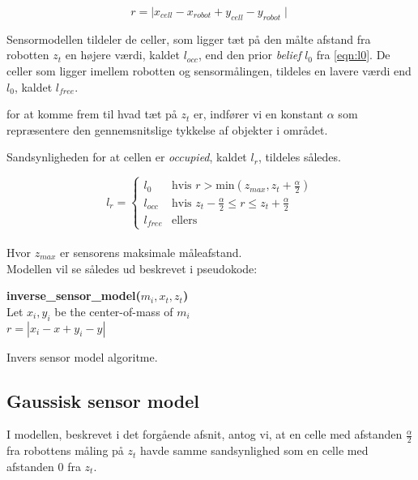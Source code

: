 \begin{equation}
r = \mid x_{cell} - x_{robot} + y_{cell} - y_{robot} \mid
\end{equation}

Sensormodellen tildeler de celler, som ligger tæt på den målte afstand fra robotten $z_t$ en højere værdi, kaldet $l_{occ}$, end den prior \textit{belief} $l_0$ fra \cref{eqn:l0}.
De celler som ligger imellem robotten og sensormålingen, tildeles en lavere værdi end $l_0$, kaldet $l_{free}$. 

for at komme frem til hvad tæt på $z_t$ er, indfører vi en konstant $\alpha$ som repræsentere den gennemsnitslige tykkelse af objekter i området.

Sandsynligheden for at cellen er \emph{occupied}, kaldet $l_r$, tildeles således.

\begin{equation}
l_{r} = \begin{cases} 
	l_0 &\text{hvis }r > \text{min}(z_{max},z_t+\frac{\alpha}{2}) \\ 
	l_{occ} &\text{hvis } z_t-\frac{\alpha}{2} \leq r \leq z_t+\frac{\alpha}{2}\\ 
	l_{free} &\text{ellers}  
\end{cases}
\end{equation} \\
Hvor $z_{max}$ er sensorens maksimale måleafstand.
\\
Modellen vil se således ud beskrevet i pseudokode:

\begin{algorithm}[H]
\textbf{inverse_sensor_model($m_i, x_t, z_t$)} \\
Let $x_i,y_i$ be the center-of-mass of $m_i$ \\
$r = |x_i - x + y_i - y|$ \\
\caption{Invers sensor model algoritme.}
\label{alg:inversesensormodel}
\end{algorithm}

\subsection{Gaussisk sensor model}\label{mapping:gaussisk}

I modellen, beskrevet i det forgående afsnit, antog vi, at en celle
med afstanden $\frac{\alpha}{2}$ fra robottens måling på $z_t$ havde
samme sandsynlighed som en celle med afstanden 0 fra $z_t$.

